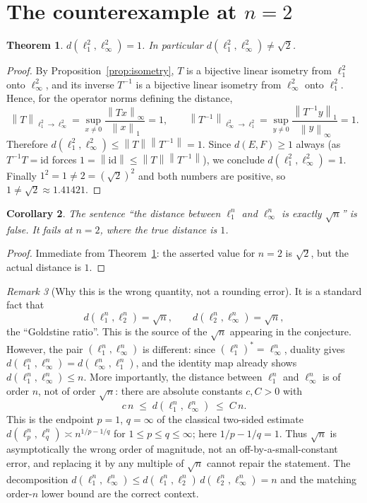 \documentclass[11pt]{article}
\newtheorem{theorem}{Theorem}
\newtheorem{corollary}[theorem]{Corollary}
\theoremstyle{definition}
\theoremstyle{remark}
\newtheorem{remark}[theorem]{Remark}
\newcommand{\norm}[1]{\left\lVert #1 \right\rVert}
\newcommand{\linf}{\ell_\infty}
\newcommand{\lone}{\ell_1}
\newcommand{\ltwo}{\ell_2}
\begin{document}
\section{The counterexample at $n=2$}

\begin{theorem}\label{thm:main}
$d(\lone^2,\linf^2)=1$. In particular $d(\lone^2,\linf^2)\neq\sqrt2$.
\end{theorem}

\begin{proof}
By Proposition~\ref{prop:isometry}, $T$ is a bijective linear isometry from
$\lone^2$ onto $\linf^2$, and its inverse $T^{-1}$ is a bijective linear
isometry from $\linf^2$ onto $\lone^2$. Hence, for the operator norms defining
the distance,
\[
  \norm{T}_{\lone^2\to\linf^2}
  =\sup_{x\neq0}\frac{\norm{Tx}_\infty}{\norm{x}_1}=1,
  \qquad
  \norm{T^{-1}}_{\linf^2\to\lone^2}
  =\sup_{y\neq0}\frac{\norm{T^{-1}y}_1}{\norm{y}_\infty}=1.
\]
Therefore $d(\lone^2,\linf^2)\le\norm{T}\norm{T^{-1}}=1$. Since
$d(E,F)\ge1$ always (as $T^{-1}T=\mathrm{id}$ forces
$1=\norm{\mathrm{id}}\le\norm{T}\norm{T^{-1}}$), we conclude
$d(\lone^2,\linf^2)=1$. Finally $1^2=1\neq2=(\sqrt2)^2$ and both numbers are
positive, so $1\neq\sqrt2\approx1.41421$.
\end{proof}

\begin{corollary}
The sentence ``the distance between $\lone^n$ and $\linf^n$ is exactly
$\sqrt n$'' is false. It fails at $n=2$, where the true distance is $1$.
\end{corollary}

\begin{proof}
Immediate from Theorem~\ref{thm:main}: the asserted value for $n=2$ is
$\sqrt2$, but the actual distance is $1$.
\end{proof}

\begin{remark}[Why this is the wrong quantity, not a rounding error]
It is a standard fact that
\[
  d(\lone^n,\ltwo^n)=\sqrt n,
  \qquad
  d(\ltwo^n,\linf^n)=\sqrt n ,
\]
the ``Goldstine ratio''. This is the source of the $\sqrt n$ appearing in the
conjecture. However, the pair $(\lone^n,\linf^n)$ is different: since
$(\lone^n)^*=\linf^n$, duality gives $d(\lone^n,\linf^n)=d(\linf^n,\lone^n)$,
and the identity map already shows $d(\lone^n,\linf^n)\le n$. More
importantly, the distance between $\lone^n$ and $\linf^n$ is of order $n$, not
of order $\sqrt n$: there are absolute constants $c,C>0$ with
\[
  c\,n \;\le\; d(\lone^n,\linf^n) \;\le\; C\,n .
\]
This is the endpoint $p=1$, $q=\infty$ of the classical two-sided estimate
$d(\ell_p^n,\ell_q^n)\asymp n^{1/p-1/q}$ for $1\le p\le q\le\infty$; here
$1/p-1/q=1$. Thus $\sqrt n$ is asymptotically the wrong order of magnitude,
not an off-by-a-small-constant error, and replacing it by any multiple of
$\sqrt n$ cannot repair the statement. The decomposition
$d(\lone^n,\linf^n)\le d(\lone^n,\ltwo^n)\,d(\ltwo^n,\linf^n)=n$ and the
matching order-$n$ lower bound are the correct context.
\end{remark}
\end{document}
